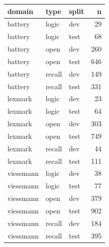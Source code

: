 \begin{tabular}{lllr}
\toprule
domain & type & split & n \\
\midrule
battery & logic & dev & 29 \\
battery & logic & test & 68 \\
battery & open & dev & 260 \\
battery & open & test & 646 \\
battery & recall & dev & 149 \\
battery & recall & test & 331 \\
lexmark & logic & dev & 23 \\
lexmark & logic & test & 64 \\
lexmark & open & dev & 303 \\
lexmark & open & test & 749 \\
lexmark & recall & dev & 44 \\
lexmark & recall & test & 111 \\
viessmann & logic & dev & 38 \\
viessmann & logic & test & 77 \\
viessmann & open & dev & 379 \\
viessmann & open & test & 902 \\
viessmann & recall & dev & 184 \\
viessmann & recall & test & 395 \\
\bottomrule
\end{tabular}

